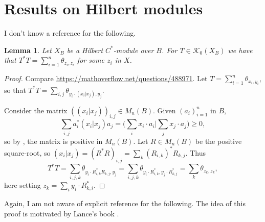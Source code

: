 \documentclass[a4paper,11pt]{article}
\theoremstyle{plain}
\newtheorem{lemma}[proposition]{Lemma}
\theoremstyle{remark}
\newcommand{\mc}[1]{\mathcal{#1}}
\begin{document}







\appendix

\section{Results on Hilbert modules}

I don't know a reference for the following.

\begin{lemma}\label{lem:positive_finite_ranks}
Let $X_B$ be a Hilbert $C^*$-module over $B$.  For $T\in \mc K_0(X_B)$ we have that $T^*T = \sum_{i=1}^n \theta_{z_i, z_i}$ for some $z_i$ in $X$.
\end{lemma}
\begin{proof}
Compare \url{https://mathoverflow.net/questions/488971}.  Let $T = \sum_{i=1}^n \theta_{x_i, y_i}$, so that $T^*T = \sum_{i,j} \theta_{y_i \cdot (x_i|x_j), y_j}$.

Consider the matrix $((x_i|x_j))_{i,j} \in M_n(B)$.  Given $(a_i)_{i=1}^n$ in $B$,
\[ \sum_{i,j} a_i^* (x_i|x_j) a_j = \Big( \sum_i x_i\cdot a_i \Big| \sum_j x_j\cdot a_j \Big) \geq 0, \]
so by \cite[Lemma~IV.3.2]{TakesakiI}, the matrix is positive in $M_n(B)$.  Let $R\in M_n(B)$ be the positive square-root, so $(x_i|x_j) = (R^*R)_{i,j} = \sum_k (R_{i,k})^* R_{k,j}$.  Thus
\[ T^*T = \sum_{i,j,k} \theta_{y_i \cdot R^*_{i,k} R_{k,j}, y_j}
= \sum_{i,j,k} \theta_{y_i \cdot R^*_{i,k}, y_j\cdot R_{k,j}^*}
= \sum_k \theta_{z_k, z_k}, \]
here setting $z_k = \sum_i y_i \cdot R_{k,i}^*$.
\end{proof}

Again, I am not aware of explicit reference for the following.  The idea of this proof is motivated by Lance's book \cite{Lance_HilbModsBook}.
\end{document}
